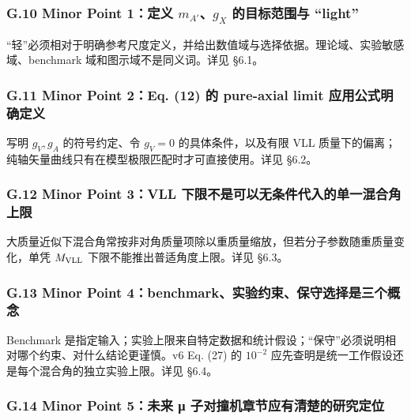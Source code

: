\documentclass[
]{article}
\begin{document}
\subsubsection{\texorpdfstring{G.10 Minor Point 1：定义
\(m_{A'}\)、\(g_X\) 的目标范围与
``light''}{G.10 Minor Point 1：定义 m\_\{A\textquotesingle\}、g\_X 的目标范围与 ``light''}}\label{g.10-minor-point-1ux5b9aux4e49-m_ag_x-ux7684ux76eeux6807ux8303ux56f4ux4e0e-light}

``轻''必须相对于明确参考尺度定义，并给出数值域与选择依据。理论域、实验敏感域、benchmark
域和图示域不是同义词。详见 §6.1。

\subsubsection{G.11 Minor Point 2：Eq. (12) 的 pure-axial limit
应用公式明确定义}\label{g.11-minor-point-2eq.-12-ux7684-pure-axial-limit-ux5e94ux7528ux516cux5f0fux660eux786eux5b9aux4e49}

写明 \(g_V,g_A\) 的符号约定、令 \(g_V=0\) 的具体条件，以及有限 VLL
质量下的偏离；纯轴矢量曲线只有在模型极限匹配时才可直接使用。详见 §6.2。

\subsubsection{G.12 Minor Point 3：VLL
下限不是可以无条件代入的单一混合角上限}\label{g.12-minor-point-3vll-ux4e0bux9650ux4e0dux662fux53efux4ee5ux65e0ux6761ux4ef6ux4ee3ux5165ux7684ux5355ux4e00ux6df7ux5408ux89d2ux4e0aux9650}

大质量近似下混合角常按非对角质量项除以重质量缩放，但若分子参数随重质量变化，单凭
\(M_{\rm VLL}\) 下限不能推出普适角度上限。详见 §6.3。

\subsubsection{G.13 Minor Point
4：benchmark、实验约束、保守选择是三个概念}\label{g.13-minor-point-4benchmarkux5b9eux9a8cux7ea6ux675fux4fddux5b88ux9009ux62e9ux662fux4e09ux4e2aux6982ux5ff5}

Benchmark
是指定输入；实验上限来自特定数据和统计假设；``保守''必须说明相对哪个约束、对什么结论更谨慎。v6
Eq. (27) 的 \(10^{-2}\)
应先查明是统一工作假设还是每个混合角的独立实验上限。详见 §6.4。

\subsubsection{G.14 Minor Point 5：未来 μ
子对撞机章节应有清楚的研究定位}\label{g.14-minor-point-5ux672aux6765-ux3bc-ux5b50ux5bf9ux649eux673aux7ae0ux8282ux5e94ux6709ux6e05ux695aux7684ux7814ux7a76ux5b9aux4f4d}
\end{document}
